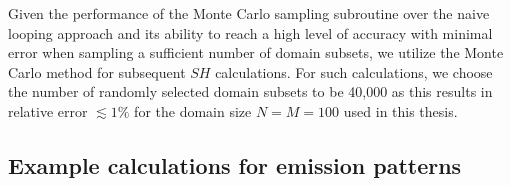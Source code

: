 Given the performance of the Monte Carlo sampling subroutine over the naive looping approach and its ability to reach a high level of accuracy with minimal error when sampling a sufficient number of domain subsets, we utilize the Monte Carlo method for subsequent $SH$ calculations. For such calculations, we choose the number of randomly selected domain subsets to be 40,000 as this results in relative error $\lesssim 1\%$ for the domain size $N=M=100$ used in this thesis.

\subsection{Example calculations for emission patterns}

